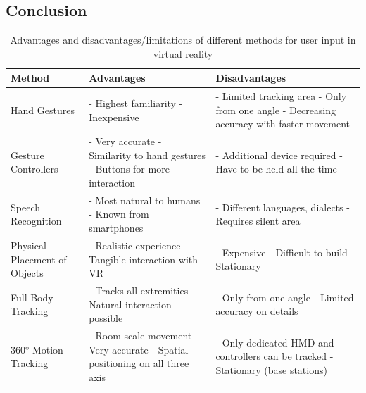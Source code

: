 
\subsection{Conclusion}

\begin{table}[b]
	\begin{center}
		\begin{tabular}{ | p{3.7cm} | p{4.9cm} | p{4.9cm} | } 
			\hline
			\textbf{Method} & \textbf{Advantages} & \textbf{Disadvantages} \\
			\hline
			Hand Gestures & 
			- Highest familiarity \newline - Inexpensive & 
			- Limited tracking area \newline - Only from one angle \newline - Decreasing accuracy with faster movement  \\
			\hline
			Gesture Controllers &
			- Very accurate \newline - Similarity to hand gestures \newline - Buttons for more interaction &
			- Additional device required \newline - Have to be held all the time \\
			\hline
			Speech Recognition &
			- Most natural to humans \newline - Known from smartphones &
			- Different languages, dialects \newline - Requires silent area \\ 
			\hline
			Physical Placement of Objects &
			- Realistic experience \newline - Tangible interaction with VR &
			- Expensive \newline - Difficult to build \newline - Stationary \\ 
			\hline
			Full Body Tracking &
			- Tracks all extremities \newline - Natural interaction possible &
			- Only from one angle \newline - Limited accuracy on details \\ 
			\hline
			360° Motion Tracking &
			- Room-scale movement \newline - Very accurate \newline - Spatial positioning on all three axis &
			- Only dedicated HMD and controllers can be tracked \newline - Stationary (base stations) \\ 
			\hline
		\end{tabular}
		\caption{Advantages and disadvantages/limitations of different methods for user input in virtual reality}
		\label{tbl:methodscomparison}
	\end{center}
\end{table}

